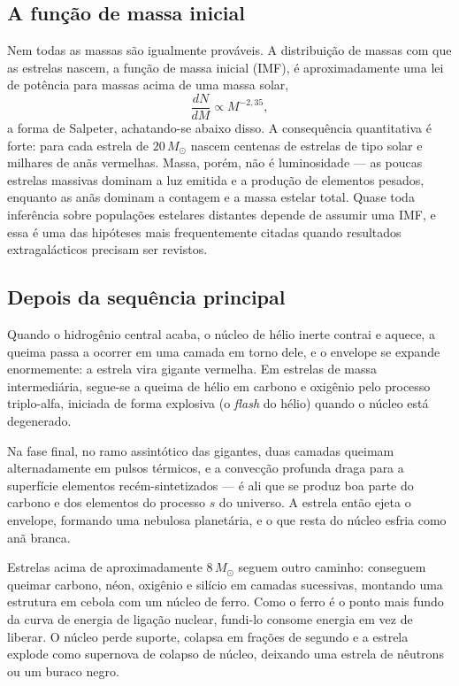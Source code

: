 \documentclass[11pt,a4paper]{article}
\begin{document}
\subsection*{A função de massa inicial}

Nem todas as massas são igualmente prováveis. A distribuição de massas com que as estrelas nascem, a função de massa inicial (IMF), é aproximadamente uma lei de potência para massas acima de uma massa solar,
\[
\frac{dN}{dM}\propto M^{-2{,}35},
\]
a forma de Salpeter, achatando-se abaixo disso. A consequência quantitativa é forte: para cada estrela de $20\,M_\odot$ nascem centenas de estrelas de tipo solar e milhares de anãs vermelhas. Massa, porém, não é luminosidade --- as poucas estrelas massivas dominam a luz emitida e a produção de elementos pesados, enquanto as anãs dominam a contagem e a massa estelar total. Quase toda inferência sobre populações estelares distantes depende de assumir uma IMF, e essa é uma das hipóteses mais frequentemente citadas quando resultados extragalácticos precisam ser revistos.

\subsection*{Depois da sequência principal}

Quando o hidrogênio central acaba, o núcleo de hélio inerte contrai e aquece, a queima passa a ocorrer em uma camada em torno dele, e o envelope se expande enormemente: a estrela vira gigante vermelha. Em estrelas de massa intermediária, segue-se a queima de hélio em carbono e oxigênio pelo processo triplo-alfa, iniciada de forma explosiva (o \textit{flash} do hélio) quando o núcleo está degenerado.

Na fase final, no ramo assintótico das gigantes, duas camadas queimam alternadamente em pulsos térmicos, e a convecção profunda draga para a superfície elementos recém-sintetizados --- é ali que se produz boa parte do carbono e dos elementos do processo $s$ do universo. A estrela então ejeta o envelope, formando uma nebulosa planetária, e o que resta do núcleo esfria como anã branca.

Estrelas acima de aproximadamente $8\,M_\odot$ seguem outro caminho: conseguem queimar carbono, néon, oxigênio e silício em camadas sucessivas, montando uma estrutura em cebola com um núcleo de ferro. Como o ferro é o ponto mais fundo da curva de energia de ligação nuclear, fundi-lo consome energia em vez de liberar. O núcleo perde suporte, colapsa em frações de segundo e a estrela explode como supernova de colapso de núcleo, deixando uma estrela de nêutrons ou um buraco negro.
\end{document}
